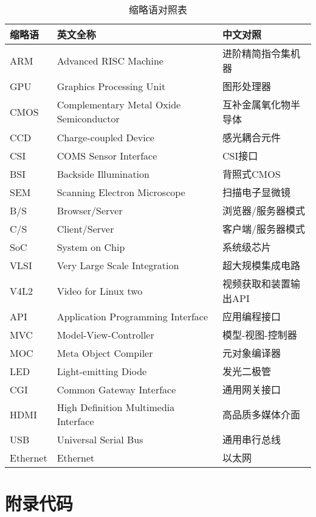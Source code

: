 \begin{table}[htbp]
	\caption{\label{tab:index}缩略语对照表}
	\centering
\begin{tabular}{L{1.8cm} C{7cm} R{4.5cm} }
		\toprule
		缩略语 & 英文全称 & 中文对照\\
		\midrule
		ARM & Advanced RISC Machine  & 进阶精简指令集机器 \\
		GPU & Graphics Processing Unit & 图形处理器 \\
		CMOS & Complementary Metal Oxide Semiconductor & 互补金属氧化物半导体 \\
		CCD & Charge-coupled Device  & 感光耦合元件 \\
		CSI & COMS Sensor Interface & CSI接口\\
		BSI & Backside Illumination & 背照式CMOS \\
		SEM & Scanning Electron Microscope & 扫描电子显微镜\\
		B/S & Browser/Server & 浏览器/服务器模式 \\
		C/S & Client/Server  & 客户端/服务器模式 \\
		SoC & System on Chip  & 系统级芯片 \\
		VLSI & Very Large Scale Integration & 超大规模集成电路 \\
		V4L2 & Video for Linux two & 视频获取和装置输出API \\
		API   & Application Programming Interface  & 应用编程接口 \\
		MVC & Model-View-Controller & 模型-视图-控制器 \\
		MOC & Meta Object Compiler & 元对象编译器 \\
		LED & Light-emitting Diode & 发光二极管 \\
		CGI & Common Gateway Interface  & 通用网关接口\\
		HDMI & High Definition Multimedia Interface & 高品质多媒体介面\\
	    USB & Universal Serial Bus  & 通用串行总线 \\
		Ethernet & Ethernet & 以太网\\
		\bottomrule
\end{tabular}
\end{table}

\chapter{附录代码}


%

